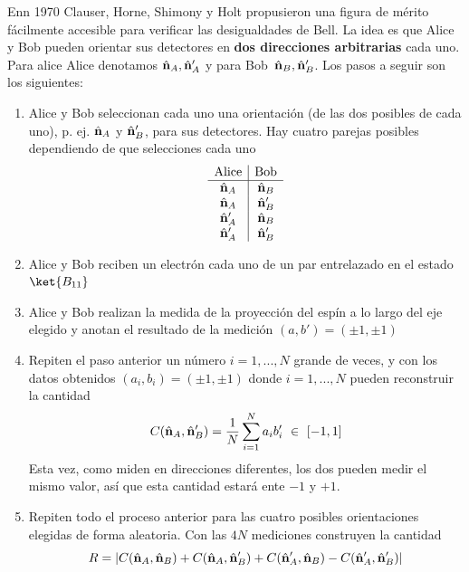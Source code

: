 \documentclass[a4paper,11pt]{book} %
\numberwithin{equation}{chapter}
\begin{document}
Enn 1970 Clauser, Horne, Shimony y Holt \cite{Bell_CHSH} propusieron una figura de mérito fácilmente accesible para verificar las desigualdades de Bell. La idea es que Alice y Bob pueden orientar sus detectores en \textbf{dos direcciones  arbitrarias} cada uno. Para alice Alice denotamos $\hat{\bf n}_A, \hat{\bf n}'_A$  y  para Bob $\, \hat{\bf n}_B, \hat{\bf n}'_B$. Los pasos a seguir son los siguientes:
\begin{enumerate}
	\item Alice y Bob seleccionan cada uno una orientación (de las dos posibles de cada uno), p. ej.  $\hat{\bf n}_A$ y $\hat{\bf n}'_B$, para sus detectores. 
	Hay cuatro parejas posibles dependiendo de que selecciones cada uno
	$$
	\begin{array}{c|c} {\rm Alice} & {\rm Bob} \\ 
	\hline \hat{\bf n}_A  &  \hat{\bf n}_B     \\ 
	\hat{\bf n}_A         &  \hat{\bf n}'_B    \\ 
	\hat{\bf n}'_A        &  \hat{\bf n}_B     \\ 
	\hat{\bf n}'_A        &  \hat{\bf n}'_B \end{array}
	$$

	\item Alice y Bob reciben un electrón cada uno de un par entrelazado en el estado $\ket{B_{11}}$

	\item Alice y Bob realizan la medida de la proyección del espín a lo largo del eje elegido y anotan el resultado de la medición $(a,b')=(\pm 1, \pm 1)$
	
	\item Repiten el paso anterior un número $i=1,..., N$ grande de veces, y con los datos obtenidos $(a_i,b_i)=(\pm 1, \pm 1)$
donde $i=1,...,N$ pueden reconstruir la cantidad
	$$
	 C(\hat{\bf n}_A, \hat{\bf n}'_B) = \frac{1}{N}\sum_{i=1}^N a_i b'_i ~\in~  [-1,1]
	$$
Esta vez, como miden en direcciones diferentes, los dos pueden medir el mismo valor, así que esta cantidad estará ente $-1$ y $+1$.

	\item Repiten todo el proceso anterior para las cuatro posibles orientaciones elegidas de forma aleatoria. Con las  $4N$ mediciones construyen la cantidad
	\begin{equation} \label{ec_entrelazamiento_bell_R}
	R = | C(\hat{\bf n}_A, \hat{\bf n}_B) +  C(\hat{\bf n}_A, \hat{\bf n}'_B) +  C(\hat{\bf n}'_A, \hat{\bf n}_B)-  
	C(\hat{\bf n}'_A, \hat{\bf n}'_B)|
	\end{equation}

\end{enumerate}
\end{document}
